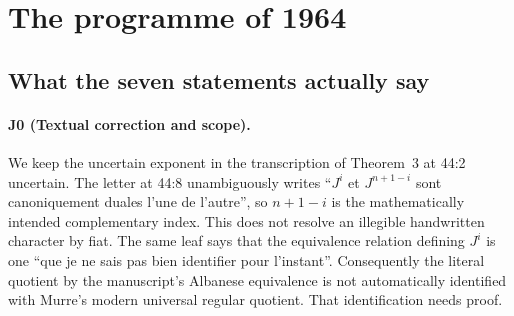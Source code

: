 \section{The programme of 1964}
\subsection{What the seven statements actually say}
\paragraph{J0 (Textual correction and scope).}
We keep the uncertain exponent in the transcription of Theorem~3
at 44:2 uncertain.  The letter at 44:8 unambiguously writes
``$J^i$ et $J^{n+1-i}$ sont canoniquement duales l'une de l'autre'',
so $n+1-i$ is the mathematically intended complementary index.
This does not resolve an illegible handwritten character by fiat.
The same leaf says that the equivalence relation defining $J^i$ is
one ``que je ne sais pas bien identifier pour l'instant''.
Consequently the literal quotient by the manuscript's Albanese
equivalence is not automatically identified with Murre's modern
universal regular quotient.  That identification needs proof.

